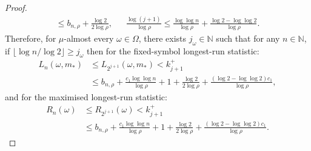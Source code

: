 \documentclass[12pt,reqno]{amsart}
\theoremstyle{definition}
\theoremstyle{plain}
\begin{document}
\begin{proof}
\begin{align*}
    \leq b_{n,\rho}+\frac{\log{2}}{2\log{\rho}},
    &&
    \frac{\log{(j+1)}}{\log{\rho}}\leq\frac{\log{\log{n}}}{\log{\rho}}+\frac{\log{2}-\log{\log{2}}}{\log{\rho}}.
\end{align*}
Therefore, for $\mu$-almost every $\omega\in\Omega$, there exists $j_\omega\in\mathbb{N}$ such that for any $n\in\mathbb{N}$, if $\lfloor \log{n}/\log{2} \rfloor\geq j_\omega$ then for the fixed-symbol longest-run statistic:
\begin{align}\label{eq: abstract-upper-L}
    L_n(\omega,m_*)
    &\leq L_{2^{j+1}}(\omega,m_*) <k^+_{j+1} \nonumber \\
    &\leq b_{n,\rho}+\frac{c_1\log{\log{n}}}{\log{\rho}}+1+\frac{\log{2}}{2\log{\rho}}+\frac{(\log{2}-\log{\log{2}})c_1}{\log{\rho}},
\end{align}
and for the maximised longest-run statistic:
\begin{align}\label{eq: abstract-upper-R}
    R_n(\omega)
    &\leq R_{2^{j+1}}(\omega) <k^+_{j+1} \nonumber \\
    &\leq b_{n,\rho}+\frac{c_1\log{\log{n}}}{\log{\rho}}+1+\frac{\log{2}}{2\log{\rho}}+\frac{(\log{2}-\log{\log{2}})c_1}{\log{\rho}}.
\end{align}


\end{proof}
\end{document}
